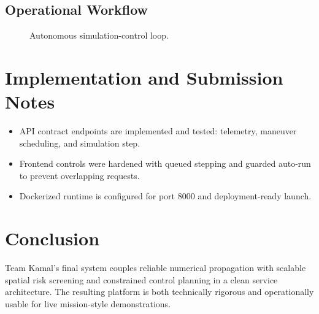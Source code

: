 \documentclass[11pt,a4paper]{article}
\begin{document}
\subsection{Operational Workflow}
\begin{figure}[h!]
\centering
{}
\caption{Autonomous simulation-control loop.}
\end{figure}

\section{Implementation and Submission Notes}
\begin{itemize}
  \item API contract endpoints are implemented and tested: telemetry, maneuver scheduling, and simulation step.
  \item Frontend controls were hardened with queued stepping and guarded auto-run to prevent overlapping requests.
  \item Dockerized runtime is configured for port 8000 and deployment-ready launch.
\end{itemize}

\section{Conclusion}
Team Kamal's final system couples reliable numerical propagation with scalable spatial risk screening and constrained control planning in a clean service architecture. The resulting platform is both technically rigorous and operationally usable for live mission-style demonstrations.
\end{document}
